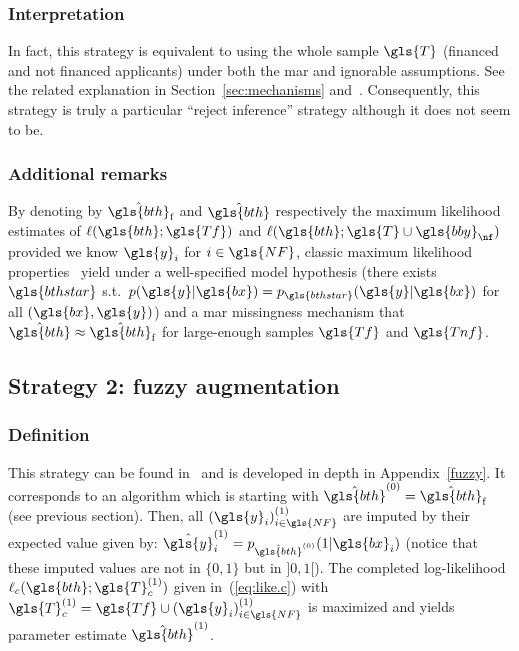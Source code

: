 \subsubsection{Interpretation}
In fact, this strategy is equivalent to using the whole sample $\gls{T}$ (financed and not financed applicants) under both the \gls{mar} and ignorable assumptions. See the related explanation in Section~\ref{sec:mechanisms} and~\cite{zadrozny2004learning}. Consequently, this strategy is truly a particular ``reject inference'' strategy although it does not seem to be.

\subsubsection{Additional remarks}
By denoting by $\hat{\gls{bth}}_\text{f}$ and $\hat{\gls{bth}}$ respectively the maximum likelihood estimates of $\ell(\gls{bth};\gls{Tf})$ and $\ell(\gls{bth};\gls{T} \cup \gls{bby}_{\nf})$ provided we know $\gls{y}_i$ for $i \in \gls{NF}$, classic maximum likelihood properties~\cite{10.2307/1912526,zadrozny2004learning} yield under a well-specified model hypothesis (there exists $\gls{bthstar}$ s.t.\ $p(\gls{y} | \gls{bx}) = p_{\gls{bthstar}}(\gls{y} | \gls{bx})$ for all $(\gls{bx},\gls{y})$) and a \gls{mar} missingness mechanism that $\hat{\gls{bth}} \approx \hat{\gls{bth}}_\text{f}$ for large-enough samples $\gls{Tf}$ and $\gls{Tnf}$.



\subsection{Strategy 2: fuzzy augmentation}

\subsubsection{Definition}
This strategy can be found in~\cite{economix} and is developed in depth in Appendix~\ref{fuzzy}. It corresponds to an algorithm which is starting with $\hat{\gls{bth}}^{(0)} = \hat{\gls{bth}}_\text{f}$ (see previous section). Then, all $(\gls{y}_i)^{(1)}_{i \in \gls{NF}}$ are imputed by their expected value given by: $\hat{\gls{y}}^{(1)}_i = p_{\hat{\gls{bth}}^{(0)}}(1 | \gls{bx}_i)$ (notice that these imputed values are not in $\{0,1\}$ but in $]0,1[$). The completed log-likelihood $\ell_c(\gls{bth};\gls{T}_c^{(1)})$ given in~(\ref{eq:like.c}) with $\gls{T}_c^{(1)}=\gls{Tf} \cup (\gls{y}_i)^{(1)}_{i \in \gls{NF}}$ is maximized and yields parameter estimate $\hat{\gls{bth}}^{(1)}$.

